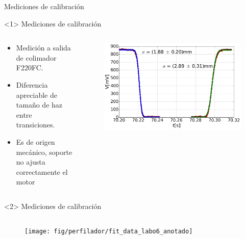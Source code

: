     \begin{frame}{Mediciones de calibración}
        \begin{onlyenv}<1>
        Mediciones de calibración
        \begin{columns}[c]
            \begin{column}{0.4\textwidth}
               \begin{itemize}
                    \item Medición a salida de colimador F220FC.
                    \item Diferencia apreciable de tamaño de haz entre transiciones.
                    \item Es de origen mecánico, soporte no ajusta correctamente el motor
                \end{itemize}
            \end{column}

            \begin{column}{0.6\textwidth}
                \begin{figure}
                    \includegraphics[width=\textwidth]{fig/perfilador/fit_data_labo6}
                    \label{fig:perfilador/fit_data_labo6}
                \end{figure} 
            \end{column}
        \end{columns}
        
    \end{onlyenv}
    \begin{onlyenv}<2>
        Mediciones de calibración
        \begin{columns}[c]
            \begin{column}{0.6\textwidth}
                \begin{figure}
                    \texttt{[image: fig/perfilador/fit\_data\_labo6\_anotado]}
                    \label{fig:perfilador/fit_data_labo6_anotado}
                \end{figure} 
             \end{column}


\end{columns}
\end{onlyenv}
\end{frame}
